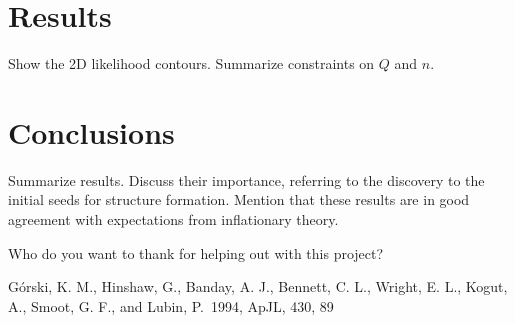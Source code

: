\documentclass{emulateapj}
\begin{document}
\section{Results}
\label{sec:results}


Show the 2D likelihood contours. Summarize constraints on $Q$ and
$n$. 


\section{Conclusions}
\label{sec:conclusions}

Summarize results. Discuss their importance, referring to the
discovery to the initial seeds for structure formation. Mention that
these results are in good agreement with expectations from
inflationary theory.








\begin{acknowledgements}
  Who do you want to thank for helping out with this project?
\end{acknowledgements}

\begin{thebibliography}{}

 G{\'o}rski, K. M.,
  Hinshaw, G., Banday, A. J., Bennett, C. L., Wright, E. L., Kogut,
  A., Smoot, G. F., and Lubin, P.\ 1994, ApJL, 430, 89

\end{thebibliography}
\end{document}
